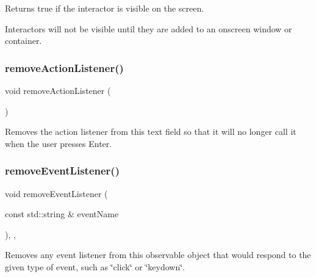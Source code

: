 Returns true if the interactor is visible on the screen. 

Interactors will not be visible until they are added to an onscreen window or container. \mbox{\label{classGTextField_ab7fe7a876367b87cf7202f947f1d05e4}} 
\subsubsection{\texorpdfstring{remove\+Action\+Listener()}{removeActionListener()}}
{\footnotesize\ttfamily void remove\+Action\+Listener (\begin{DoxyParamCaption}{ }\end{DoxyParamCaption})\hspace{0.3cm}{\ttfamily [virtual]}}



Removes the action listener from this text field so that it will no longer call it when the user presses Enter. 

\mbox{\label{classGObservable_acbcf1ed3a851ad8a3c17ef38d86b481d}} 
\subsubsection{\texorpdfstring{remove\+Event\+Listener()}{removeEventListener()}}
{\footnotesize\ttfamily void remove\+Event\+Listener (\begin{DoxyParamCaption}\item[{const std\+::string \&}]{event\+Name }\end{DoxyParamCaption})\hspace{0.3cm}{\ttfamily [protected]}, {\ttfamily [virtual]}, {\ttfamily [inherited]}}



Removes any event listener from this observable object that would respond to the given type of event, such as \char`\"{}click\char`\"{} or \char`\"{}keydown\char`\"{}. 

\mbox{\label{classGObservable_af51cc35c29a1bd1908609d432decdbb6}} 
